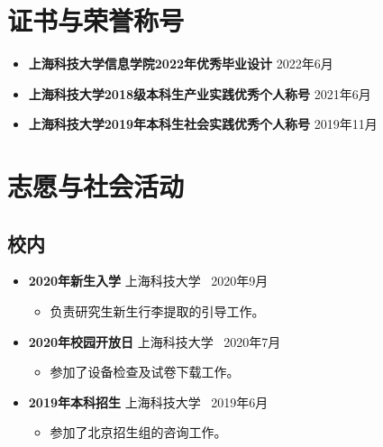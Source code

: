 \documentclass[a4paper,10pt]{ctexart} %
\begin{document}
\newpage



\section{证书与荣誉称号}

    \begin{itemize}
        \item \textbf{上海科技大学信息学院2022年优秀毕业设计} \hfill \quad 2022年6月
        \item \textbf{上海科技大学2018级本科生产业实践优秀个人称号} \hfill \quad 2021年6月
        \item \textbf{上海科技大学2019年本科生社会实践优秀个人称号} \hfill \quad 2019年11月
    \end{itemize}



\section{志愿与社会活动}

    \subsection{校内}

        \begin{itemize}
            \item \textbf{2020年新生入学} \hfill 上海科技大学 \, 2020年9月
                \begin{small} \begin{itemize}
                    \item 负责研究生新生行李提取的引导工作。
                \end{itemize} \end{small}
            \item \textbf{2020年校园开放日} \hfill 上海科技大学 \, 2020年7月
                \begin{small} \begin{itemize}
                    \item 参加了设备检查及试卷下载工作。
                \end{itemize} \end{small}
            \item \textbf{2019年本科招生}  \hfill 上海科技大学 \, 2019年6月
                \begin{small} \begin{itemize}
                    \item 参加了北京招生组的咨询工作。
                \end{itemize} \end{small}
        \end{itemize}
\end{document}
